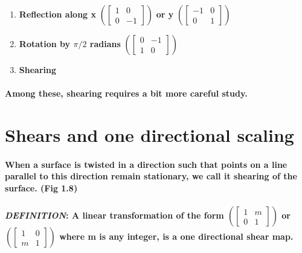 \documentclass{report}
\begin{document}
\begin{enumerate}

\item \textbf{Reflection along x} 
$ (\begin{bmatrix}
1&0\\0&-1
\end{bmatrix})$
\textbf{or y}
$ (\begin{bmatrix}
-1&0\\0&1
\end{bmatrix})$

\item \textbf{Rotation by $\pi/2$ radians}
$ (\begin{bmatrix}
0&-1\\1&0
\end{bmatrix})$

\item \textbf{Shearing}


\end{enumerate}

\paragraph{Among these, shearing requires a bit more careful study.}



\section{Shears and one directional scaling}


\paragraph{When a surface is twisted in a direction such that points on a line parallel to this direction remain stationary, we call it shearing of the surface. (Fig 1.8)}


\paragraph{\textit{DEFINITION}: A linear transformation of the form
$ (\begin{bmatrix}
1&m\\0&1
\end{bmatrix})$
or
$ (\begin{bmatrix}
1&0\\m&1
\end{bmatrix})$
where m is any integer, is a one directional shear map.
}
\end{document}
